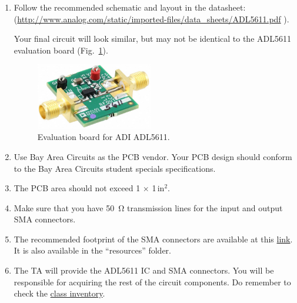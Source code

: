 \documentclass[letterpaper, 11pt]{article}
\begin{document}
\begin{enumerate}
	\item Follow the recommended schematic and layout in the datasheet:\\ (\url{http://www.analog.com/static/imported-files/data_sheets/ADL5611.pdf} ).
	
	 Your final circuit will look similar, but may not be identical to the ADL5611 evaluation board (Fig.~\ref{fig:adl5611-evalz}).
 
		\begin{figure}[h]
			\centering
			\includegraphics[width=2in]{adl5611-evalz}
			\caption{Evaluation board for ADI ADL5611.}
			\label{fig:adl5611-evalz}
		\end{figure}
	\item Use Bay Area Circuits as the PCB vendor. Your PCB design should conform to the Bay Area Circuits student specials specifications. 
	
	\item The PCB area should not exceed 1 $\times$ 1\,in$^2$.
	 
	\item Make sure that you have \SI{50}{\ohm} transmission lines for the input and output SMA connectors.
	
	\item The recommended footprint of the SMA connectors are available at this \href{https://github.com/ucdart/UCD-EEC134/blob/master/labs/lab2/resources/SMA%20Size.jpg}{link}. It is also available in the ``resources'' folder. 
	
	\item The TA will provide the ADL5611 IC and SMA connectors. You will be responsible for acquiring the rest of the circuit components. Do remember to check the \href{https://docs.google.com/spreadsheets/d/1GJnBLUymuVzXjrK0Zkdbc2lwTbw0z9a0JR4bLLzO-Sw/edit#gid=4}{class inventory}. 
	

\end{enumerate}
\end{document}
